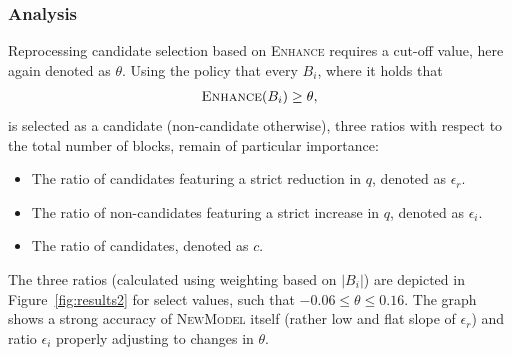 \documentclass{jdmdh}
\begin{document}
\subsubsection{Analysis}
Reprocessing candidate selection based on \textsc{Enhance} requires a cut-off value, here again denoted as $\theta$. Using the policy that every $B_i$, where it holds that
\begin{align}
    \textsc{Enhance}(B_i)\geq\theta,
\end{align}
is selected as a candidate (non-candidate otherwise), three ratios with respect to the total number of blocks, remain of particular importance: \\
\begin{itemize}
    \item The ratio of candidates featuring a strict reduction in $q$, denoted as $\epsilon_r$.
    \item The ratio of non-candidates featuring a strict increase in $q$, denoted as $\epsilon_i$.
    \item The ratio of candidates, denoted as $c$. \\
\end{itemize}
The three ratios (calculated using weighting based on $|B_i|$) are depicted in Figure~\ref{fig:results2} for select values, such that $-0.06\leq\theta\leq0.16$. The graph shows a strong accuracy of \textsc{NewModel} itself (rather low and flat slope of $\epsilon_r$) and ratio $\epsilon_i$ properly adjusting to changes in $\theta$. \\
\end{document}

